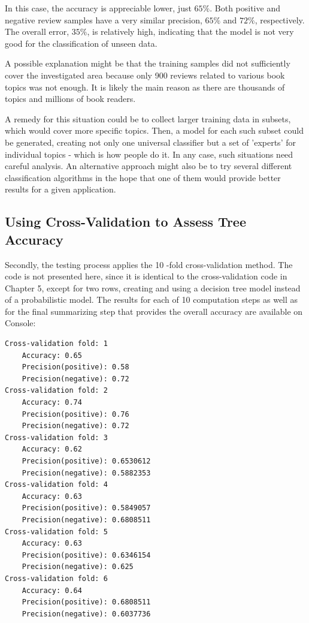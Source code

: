 In this case, the accuracy is appreciable lower, just $65 \%$. Both positive and negative review samples have a very similar precision, $65 \%$ and $72 \%$, respectively. The overall error, $35 \%$, is relatively high, indicating that the model is not very good for the classification of unseen data.

A possible explanation might be that the training samples did not sufficiently cover the investigated area because only 900 reviews related to various book topics was not enough. It is likely the main reason as there are thousands of topics and millions of book readers.

A remedy for this situation could be to collect larger training data in subsets, which would cover more specific topics. Then, a model for each such subset could be generated, creating not only one universal classifier but a set of 'experts' for individual topics - which is how people do it. In any case, such situations need careful analysis. An alternative approach might also be to try several different classification algorithms in the hope that one of them would provide better results for a given application.

\subsection{Using Cross-Validation to Assess Tree Accuracy}
Secondly, the testing process applies the 10 -fold cross-validation method. The code is not presented here, since it is identical to the cross-validation code in Chapter 5, except for two rows, creating and using a decision tree model instead of a probabilistic model. The results for each of 10 computation steps as well as for the final summarizing step that provides the overall accuracy are available on Console:

\begin{verbatim}
Cross-validation fold: 1
    Accuracy: 0.65
    Precision(positive): 0.58
    Precision(negative): 0.72
Cross-validation fold: 2
    Accuracy: 0.74
    Precision(positive): 0.76
    Precision(negative): 0.72
Cross-validation fold: 3
    Accuracy: 0.62
    Precision(positive): 0.6530612
    Precision(negative): 0.5882353
Cross-validation fold: 4
    Accuracy: 0.63
    Precision(positive): 0.5849057
    Precision(negative): 0.6808511
Cross-validation fold: 5
    Accuracy: 0.63
    Precision(positive): 0.6346154
    Precision(negative): 0.625
Cross-validation fold: 6
    Accuracy: 0.64
    Precision(positive): 0.6808511
    Precision(negative): 0.6037736
\end{verbatim}

